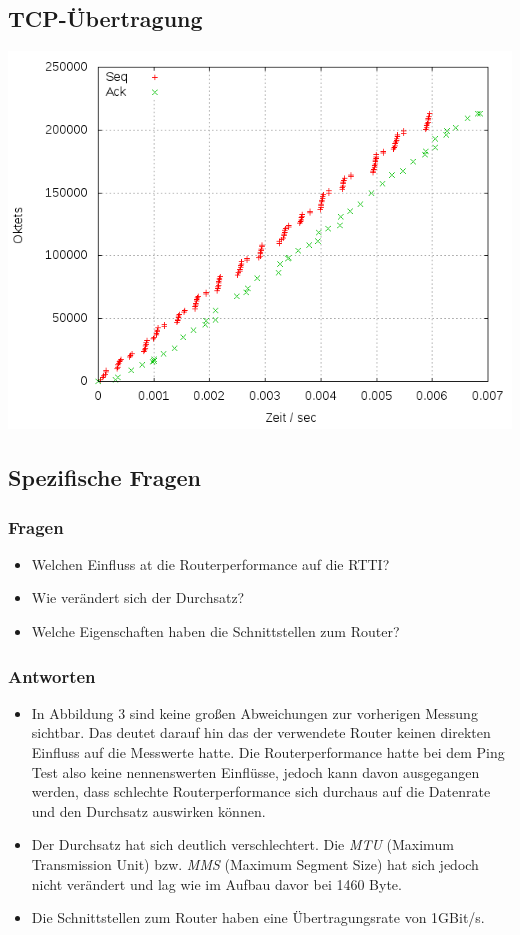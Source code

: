 \documentclass[a4paper,10pt]{article}
\begin{document}
\subsection{TCP-Übertragung}
\includegraphics[scale=0.75]{setup2.png}

\subsection{Spezifische Fragen}
\subsubsection{Fragen}
\begin{itemize}
 \item Welchen Einfluss at die Routerperformance auf die RTTI?
 \item Wie verändert sich der Durchsatz?
 \item Welche Eigenschaften haben die Schnittstellen zum Router?
\end{itemize}
\subsubsection{Antworten}
\begin{itemize}
 \item In Abbildung 3 sind keine großen Abweichungen zur vorherigen Messung sichtbar. Das deutet darauf hin
 das der verwendete Router keinen direkten Einfluss auf die Messwerte hatte. Die Routerperformance hatte bei dem
 Ping Test also keine nennenswerten Einflüsse, jedoch kann davon ausgegangen werden, dass schlechte Routerperformance
 sich durchaus auf die Datenrate und den Durchsatz auswirken können.
 \item Der Durchsatz hat sich deutlich verschlechtert. Die \textit{MTU} (Maximum Transmission Unit) bzw. \textit{MMS}
 (Maximum Segment Size) hat sich jedoch nicht verändert und lag wie im Aufbau davor bei 1460 Byte.
 \item Die Schnittstellen zum Router haben eine Übertragungsrate von 1GBit/s.
\end{itemize}
\end{document}
